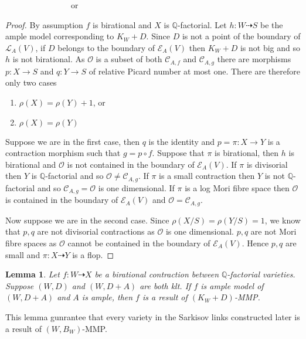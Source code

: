\documentclass{article}
\newtheorem{lem}[defn]{Lemma}
\begin{document}
$\qquad\qquad\qquad\qquad$or$\qquad\qquad\qquad\qquad$
\begin{proof}
 By assumption $f$  is birational and $X$  is $\mathbb{Q}$-factorial. Let $h: W \dashrightarrow S$ be the ample model corresponding to  $K_{W}+D$. Since $D$  is not a point of the boundary of $\mathcal{L}_{A}(V)$,  if $D$ belongs to the boundary of $\mathcal{E}_{A}(V)$ then $K_{W}+D$ is not big and so $h$  is not birational. As $\mathcal{O}$   is a subset of both $\mathcal{C}_{A,f}$ and $\mathcal{C}_{A,g}$ there are morphisms $p: X\to S $ and  $q:Y\to S$ 
of relative Picard number at most one. There are therefore only two cases
\begin{enumerate}
  \item $\rho (X)=\rho(Y)+1$, or 
  \item $\rho(X)=\rho(Y)$
\end{enumerate}
Suppose we are in the first case, then $q$ is the identity and $p=\pi:X\to Y$  is a contraction morphism such that $
g=p \circ f$. Suppose that $\pi$ is birational, then $ h $ is birational and $\mathcal{O}$ is not contained in the boundary of  $\mathcal{E}_{A}(V)$. If $\pi$ is divisorial then $Y$ is $\mathbb{Q}$-factorial and so $\mathcal{O} \neq \mathcal{C}_{A,g}$. If $\pi $ is a small contraction then $Y$ is not $\mathbb{Q}$-factorial and so $\mathcal{C}_{A,g}=\mathcal{O}$ is one dimensional. If $\pi $ is a log Mori fibre space then $\mathcal{O} $ is contained in the boundary of $\mathcal{E}_{A}(V)$ and $\mathcal{O} = \mathcal{C}_{A,g}$.

Now suppose we are in the second case. Since $\rho(X/S)=\rho(Y/S)=1$, we know that $p,q$ are not divisorial contractions as $\mathcal{O}$ is one dimensional. $p,q $ are not Mori fibre spaces as $\mathcal{O} $  cannot be contained in the boundary of $\mathcal{E}_{A}(V)$. Hence  $p,q$ are small and $\pi:X\dashrightarrow Y$ is a flop.
\end{proof}

\begin{lem}
  \cite[Lemma 3.6]{haconSarkisovProgram2012} Let $f:W\dashrightarrow X $ be a birational contraction between $\mathbb{Q}$-factorial varieties. Suppose $(W,D)$ and $(W,D+A)$ are both klt. If $f$ is ample model of $(W,D+A)$ and $A$ is ample, then $f$ is a result of  $(K_{W}+D)$-MMP.
\end{lem}
This lemma gunrantee that every variety in the Sarkisov links constructed later is a result of $(W,B_{W})$-MMP.
\end{document}
